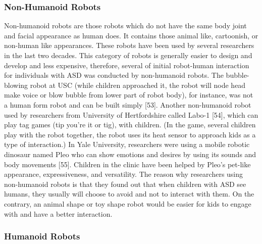\subsubsection{Non-Humanoid Robots}
Non-humanoid robots are those robots which do not have the same body joint and facial appearance as human does. It contains those animal like, cartoonish, or non-human like appearances. These robots have been used by several researchers in the last two decades. This category of robots is generally easier to design and develop and less expensive, therefore, several of initial robot-human interaction for individuals with ASD was conducted by non-humanoid robots. The bubble-blowing robot at USC (while children approached it, the robot will node head make voice or blow bubble from lower part of robot body), for instance, was not a human form robot and can be built simply [53]. Another non-humanoid robot used by researchers from University of Hertfordshire called Labo-1 [54], which can play tag games (tip you’re it or tig), with children. (In the game, several children play with the robot together, the robot uses its heat sensor to approach kids as a type of interaction.) In Yale University, researchers were using a mobile robotic dinosaur named Pleo who can show emotions and desires by using its sounds and body movements [55]. Children in the clinic have been helped by Pleo’s pet-like appearance, expressiveness, and versatility.
The reason why researchers using non-humanoid robots is that they found out that when children with ASD see humans, they usually will choose to avoid and not to interact with them. On the contrary, an animal shape or toy shape robot would be easier for kids to engage with and have a better interaction.
\subsubsection{Humanoid Robots}


